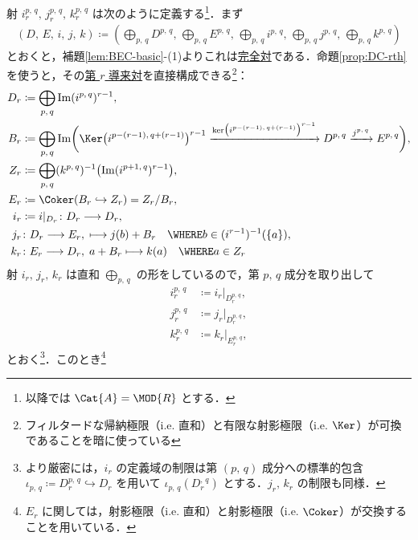 \documentclass[algtopo_main]{subfiles}
\begin{document}
射 $i_r^{p,\, q},\, j_r^{p,\, q},\, k_r^{p,\, q}$ は次のように定義する\footnote{以降では $\Cat{A} = \MOD{R}$ とする．}．まず
\begin{align}
    (D,\,E,\, i,\, j,\, k) \coloneqq \left( \bigoplus_{p,\, q} D^{p,\, q},\, \bigoplus_{p,\, q} E^{p,\, q},\, \bigoplus_{p,\, q} i^{p,\, q},\, \bigoplus_{p,\, q} j^{p,\, q},\, \bigoplus_{p,\, q} k^{p,\, q} \right) 
\end{align}
とおくと，補題\ref{lem:BEC-basic}-(1)よりこれは\hyperref[def:exact-couple]{完全対}である．命題\ref{prop:DC-rth}を使うと，その\hyperref[def:DC]{第 $r$ 導来対}を直接構成できる\footnote{フィルタードな帰納極限（i.e. 直和）と有限な射影極限（i.e. $\Ker$）が可換であることを暗に使っている}：
\begin{align}
    D_r &\coloneqq \bigoplus_{p,\, q} \Im (i^{p,\, q})^{r-1},\label{eq:DC-BEC-Dr} \\
    B_r &\coloneqq \bigoplus_{p,\, q} \Im \biggl( \Ker \bigl(i^{p-(r-1),\, q+(r-1)}\bigr)^{r-1} \xrightarrow{\ker \bigl(i^{p-(r-1),\, q+(r-1)}\bigr)^{r-1} } D^{p,\, q} \xrightarrow{j^{p,\, q}} E^{p,\, q} \biggr), \\
    Z_r &\coloneqq \bigoplus_{p,\, q} (k^{p,\, q})^{-1} \bigl( \Im (i^{p+1,\, q})^{r-1} \bigr), \\
    E_r &\coloneqq \Coker (B_r \hookrightarrow Z_r) = Z_r / B_r, \label{eq:DC-BEC-Er}\\
    i_r &\coloneqq i|_{D_r} \colon D_r \lto D_r, \label{eq:DC-BEC-ir}\\
    j_r &\colon D_r \lto E_r,\; \lmto j(b) + B_r \quad \WHERE b \in (i^{r-1})^{-1} (\{a\}), \label{eq:DC-BEC-jr} \\
    k_r &\colon E_r \lto D_r,\; a + B_r \lmto k(a) \quad \WHERE a \in Z_r \label{eq:DC-BEC-kr}
\end{align}
射 $i_r,\, j_r,\, k_r$ は直和 $\bigoplus_{p,\, q}$ の形をしているので，第 $p,\, q$ 成分を取り出して
\begin{align}
    i_r^{p,\, q} &\coloneqq i_r|_{D_r^{p,\, q}}, \\
    j_r^{p,\, q} &\coloneqq j_r|_{D_r^{p,\, q}}, \\
    k_r^{p,\, q} &\coloneqq k_r|_{E_r^{p,\, q}},
\end{align}
とおく\footnote{より厳密には，$i_r$ の定義域の制限は第 $(p,\, q)$ 成分への標準的包含 $\iota_{p,\, q} \coloneqq D_r^{p,\, q} \hookrightarrow D_r$ を用いて $\iota_{p,\, q}(D_r^{,\, q})$ とする．$j_r,\, k_r$ の制限も同様．}．このとき\footnote{$E_r$ に関しては，射影極限（i.e. 直和）と射影極限（i.e. $\Coker$）が交換することを用いている．}
\end{document}
